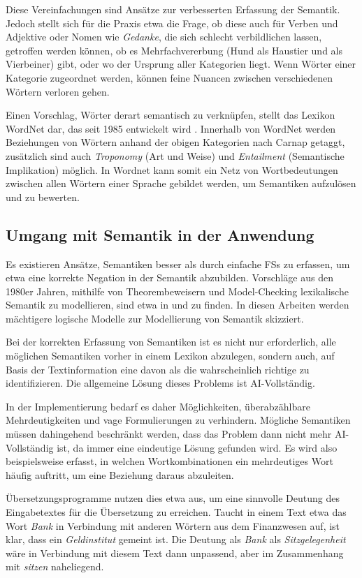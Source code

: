 \documentclass[12pt]{report}
\begin{document}
Diese Vereinfachungen sind Ansätze zur verbesserten Erfassung der Semantik.  Jedoch stellt sich für die Praxis etwa die Frage, ob diese auch für Verben und Adjektive oder Nomen wie \textit{\glqq  Gedanke\grqq{}}, die sich schlecht verbildlichen lassen, getroffen werden können, ob es \glqq  Mehrfachvererbung\grqq{} (Hund als Haustier und als Vierbeiner) gibt, oder wo der Ursprung aller Kategorien liegt. Wenn Wörter einer Kategorie zugeordnet werden, können feine Nuancen zwischen verschiedenen Wörtern verloren gehen. 

Einen Vorschlag, Wörter derart semantisch zu verknüpfen, stellt das Lexikon WordNet dar, das seit 1985 entwickelt wird \cite{mil95}. Innerhalb von WordNet werden Beziehungen von Wörtern anhand der obigen Kategorien nach Carnap getaggt, zusätzlich sind auch \textit{Troponomy} (Art und Weise) und \textit{Entailment} (Semantische Implikation) möglich. In Wordnet kann somit ein Netz von Wortbedeutungen zwischen allen Wörtern einer Sprache gebildet werden, um Semantiken aufzulösen und zu bewerten. 

\subsection{Umgang mit Semantik in der Anwendung}
Es existieren Ansätze, Semantiken besser als durch einfache FSs zu erfassen, um etwa eine korrekte Negation in der Semantik abzubilden. Vorschläge aus den 1980er Jahren, mithilfe von Theorembeweisern und Model-Checking lexikalische Semantik zu modellieren, sind etwa in \cite{sb88} und \cite{kn85} zu finden. In diesen Arbeiten werden mächtigere logische Modelle zur Modellierung von Semantik skizziert. 

Bei der korrekten Erfassung von Semantiken ist es nicht nur erforderlich, alle möglichen Semantiken vorher in einem Lexikon abzulegen, sondern auch, auf Basis der Textinformation eine davon als die wahrscheinlich richtige zu identifizieren. Die allgemeine Lösung dieses Problems ist AI-Vollständig. 

In der Implementierung bedarf es daher Möglichkeiten, überabzählbare Mehrdeutigkeiten und vage Formulierungen zu verhindern. Mögliche Semantiken müssen dahingehend beschränkt werden, dass das Problem dann nicht mehr AI-Vollständig ist, da immer eine eindeutige Lösung gefunden wird. Es wird also beispielsweise erfasst, in welchen Wortkombinationen ein mehrdeutiges Wort häufig auftritt, um eine Beziehung daraus abzuleiten. 

Übersetzungsprogramme nutzen dies etwa aus, um eine sinnvolle Deutung des Eingabetextes für die Übersetzung zu erreichen. Taucht in einem Text etwa das Wort \textit{Bank} in Verbindung mit anderen Wörtern aus dem Finanzwesen auf, ist klar, dass ein \textit{Geldinstitut} gemeint ist. Die Deutung als \textit{Bank} als \textit{Sitzgelegenheit} wäre in Verbindung mit diesem Text dann unpassend, aber im Zusammenhang mit \textit{sitzen} naheliegend. 
\end{document}
